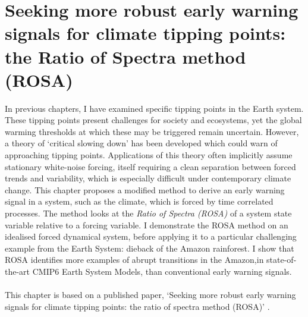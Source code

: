 \chapter{Seeking more robust early warning signals for climate tipping points: the Ratio of Spectra method (ROSA)}
\label{chapter:rosa}
\graphicspath{{ROSA/figs}}



In previous chapters, I have examined specific tipping points in the Earth system.
These tipping points present challenges for society and 
ecosystems, yet the global warming thresholds at which these may be triggered remain uncertain. However,
a theory of `critical slowing down' has been developed which could warn of approaching tipping points. 
Applications of this theory often implicitly assume stationary white-noise forcing,  itself requiring a clean separation
between forced trends and variability, which is especially difficult under contemporary climate change. 
This chapter proposes a modified method to derive an early warning signal in a 
system, such as the climate, which is forced by time correlated processes. 
The method looks at the \emph{Ratio of Spectra (ROSA)} of a system state variable relative to a forcing variable.   
I demonstrate the ROSA method on an idealised forced dynamical system, before applying it 
to a particular challenging example from the Earth System: dieback of the Amazon rainforest.
I show that ROSA identifies more examples of abrupt transitions in the Amazon,in state-of-the-art CMIP6 Earth System Models, than conventional early warning signals.
\\\\
This chapter is based on a published paper, `Seeking more robust early warning signals for climate tipping points: the ratio of spectra method (ROSA)' \parencite{Clarke2023}.

